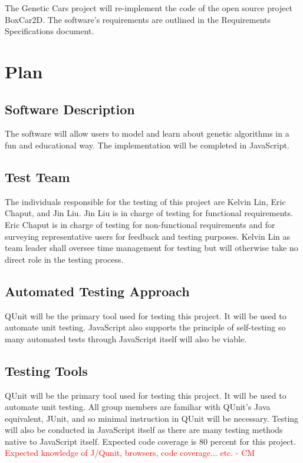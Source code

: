 \documentclass[12pt, titlepage]{article}
\begin{document}
The Genetic Cars project will re-implement the code of the open source project 
BoxCar2D. The software's requirements are outlined in the Requirements 
Specifications document.

\section{Plan}
	
\subsection{Software Description}

The software will allow users to model and learn about genetic algorithms in a 
fun and educational way. The implementation will be completed in JavaScript.

\subsection{Test Team}

The individuals responsible for the testing of this project are  Kelvin Lin, 
Eric Chaput, and  Jin Liu. Jin Liu is in charge of testing for functional 
requirements. Eric Chaput is in charge of testing for non-functional 
requirements and for surveying representative users for feedback and testing 
purposes. Kelvin Lin as team leader shall oversee time management for testing 
but will otherwise take no direct role in the testing process.

\subsection{Automated Testing Approach}

QUnit will be the primary tool used for testing this project. It will be used to 
automate unit testing. JavaScript also supports the principle of self-testing so 
many automated tests through JavaScript itself will also be viable.

\subsection{Testing Tools}

QUnit will be the primary tool used for testing this project. It will be used to 
automate unit testing. All group members are familiar with QUnit's Java 
equivalent, JUnit, and so minimal instruction in QUnit will be necessary. 
Testing will also be conducted in JavaScript itself as there are many testing 
methods native to JavaScript itself. Expected code coverage is 80 percent for this project.
\textcolor{red}{Expected knowledge of J/Qunit, browsers, code coverage... etc. - CM} \\
\end{document}
